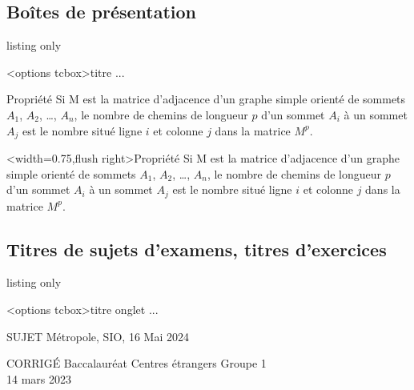 \documentclass[french,11pt,a4paper]{article}
\begin{document}
\subsection{Boîtes de présentation}

\begin{DemoCode}{listing only}
\begin{BoiteSimple}[couleur]<options tcbox>{titre}
	...
\end{BoiteSimple}
\end{DemoCode}

\begin{DemoCode}{}
\begin{BoiteSimple}[red]{Propriété}
Si M est la matrice d'adjacence d'un graphe simple orienté de sommets $A_1$, $A_2$, \dots, $A_n$, le nombre de chemins de longueur $p$ d'un sommet $A_i$  à un sommet $A_j$ est le nombre situé ligne $i$ et colonne $j$ dans la matrice $M^p$.
\end{BoiteSimple}
\end{DemoCode}

\begin{DemoCode}{}
\begin{BoiteSimple}[blue]<width=0.75\linewidth,flush right>{Propriété}
Si M est la matrice d'adjacence d'un graphe simple orienté de sommets $A_1$, $A_2$, \dots, $A_n$, le nombre de chemins de longueur $p$ d'un sommet $A_i$  à un sommet $A_j$ est le nombre situé ligne $i$ et colonne $j$ dans la matrice $M^p$.
\end{BoiteSimple}
\end{DemoCode}

\subsection{Titres de sujets d'examens, titres d'exercices}

\begin{DemoCode}{listing only}
\begin{TitreSujet}[Couleur=...,AlignH=...]<options tcbox>{titre onglet}
...
\end{TitreSujet}
\end{DemoCode}

\begin{DemoCode}{}
\begin{TitreSujet}[Couleur=red!50!black]{SUJET}
Métropole, SIO, 16 Mai 2024
\end{TitreSujet}
\end{DemoCode}

\begin{DemoCode}{}
\begin{TitreSujet}[Couleur=teal,AlignH=center]{CORRIGÉ}
Baccalauréat Centres étrangers Groupe 1\\
14 mars 2023
\end{TitreSujet}
\end{DemoCode}
\end{document}
